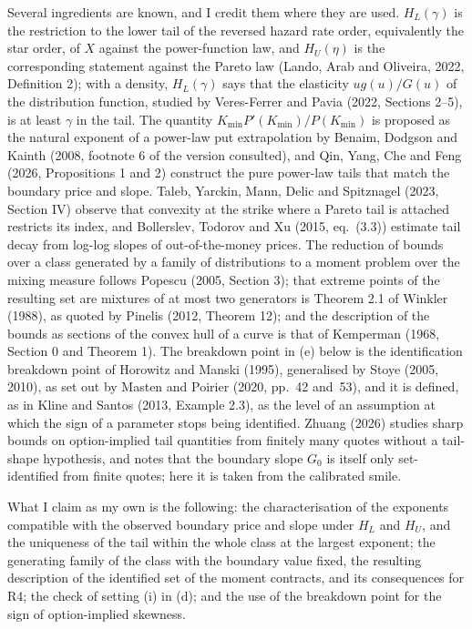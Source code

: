 \documentclass[11pt]{article}
\theoremstyle{remark}
\begin{document}
Several ingredients are known, and I credit them where they are used. $H_L(\gamma)$ is the restriction to the lower tail of the reversed hazard rate order, equivalently the star order, of $X$ against the power-function law, and $H_U(\eta)$ is the corresponding statement against the Pareto law (Lando, Arab and Oliveira, 2022, Definition 2); with a density, $H_L(\gamma)$ says that the elasticity $ug(u)/G(u)$ of the distribution function, studied by Veres-Ferrer and Pavia (2022, Sections 2--5), is at least $\gamma$ in the tail. The quantity $K_{\min}P'(K_{\min})/P(K_{\min})$ is proposed as the natural exponent of a power-law put extrapolation by Benaim, Dodgson and Kainth (2008, footnote 6 of the version consulted), and Qin, Yang, Che and Feng (2026, Propositions 1 and 2) construct the pure power-law tails that match the boundary price and slope. Taleb, Yarckin, Mann, Delic and Spitznagel (2023, Section IV) observe that convexity at the strike where a Pareto tail is attached restricts its index, and Bollerslev, Todorov and Xu (2015, eq.~(3.3)) estimate tail decay from log-log slopes of out-of-the-money prices. The reduction of bounds over a class generated by a family of distributions to a moment problem over the mixing measure follows Popescu (2005, Section 3); that extreme points of the resulting set are mixtures of at most two generators is Theorem 2.1 of Winkler (1988), as quoted by Pinelis (2012, Theorem 12); and the description of the bounds as sections of the convex hull of a curve is that of Kemperman (1968, Section 0 and Theorem 1). The breakdown point in (e) below is the identification breakdown point of Horowitz and Manski (1995), generalised by Stoye (2005, 2010), as set out by Masten and Poirier (2020, pp.~42 and~53), and it is defined, as in Kline and Santos (2013, Example 2.3), as the level of an assumption at which the sign of a parameter stops being identified. Zhuang (2026) studies sharp bounds on option-implied tail quantities from finitely many quotes without a tail-shape hypothesis, and notes that the boundary slope $G_0$ is itself only set-identified from finite quotes; here it is taken from the calibrated smile.

What I claim as my own is the following: the characterisation of the exponents compatible with the observed boundary price and slope under $H_L$ and $H_U$, and the uniqueness of the tail within the whole class at the largest exponent; the generating family of the class with the boundary value fixed, the resulting description of the identified set of the moment contracts, and its consequences for R4; the check of setting (i) in (d); and the use of the breakdown point for the sign of option-implied skewness.
\end{document}
